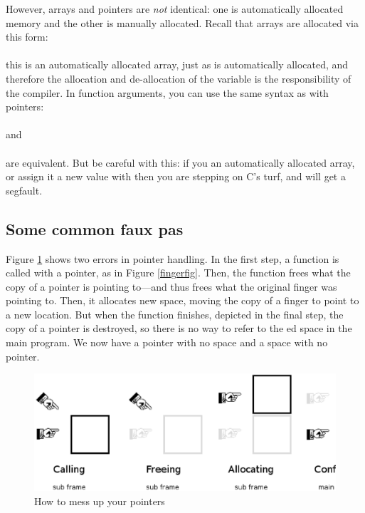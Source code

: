 However, arrays and pointers are {\em not} identical: one is
automatically allocated memory and the other is manually allocated.
Recall that arrays are allocated via this form:\\
\\
this is an automatically allocated array, just
as  is automatically allocated, and therefore
the allocation and de-allocation of the variable is the responsibility
of the compiler.  In function arguments, you can use the same
syntax as with pointers: 
\\ \\
and
\\ \\
are equivalent.
But be careful with this: if you  an automatically allocated
array, or assign it a new value with  then you are stepping
on C's turf, and will get a segfault.

\subsection{Some common faux pas} 
Figure \ref{fauxpas} shows two errors in pointer handling. In the first
step, a function is called with a pointer, as in Figure
\ref{fingerfig}. Then, the function frees what the copy of a pointer
is pointing to---and thus frees what the original finger was pointing
to. Then, it allocates new space, moving the copy of a finger to point to
a new location. But when the function finishes, depicted in the final
step, the copy of a pointer is destroyed, so there is no way to refer to
the ed space in the main program. We now have a pointer
with no space and a space with no pointer.

\begin{figure}
\hskip -1cm
\includegraphics[width=\textwidth*\real{1.1}]{pointer_faux_pas.ps}
\caption{How to mess up your pointers}
\label{fauxpas}
\end{figure}


